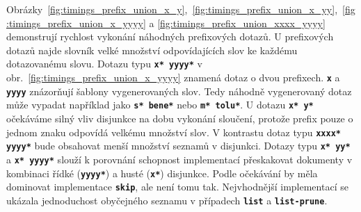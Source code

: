 \documentclass[11pt,letterpaper,oneside,openright]{book}
\newcommand{\bftt}[1]{\texttt{\textbf{#1}}}
\begin{document}
Obrázky~\ref{fig:timings_prefix_union_x_y},~\ref{fig:timings_prefix_union_x_yy},~\ref{fig:timings_prefix_union_x_yyyy}
a \ref{fig:timings_prefix_union_xxxx_yyyy} demonstrují rychlost vykonání
náhodných prefixových dotazů. U prefixových dotazů najde slovník velké množství
odpovídajících slov ke každému dotazovanému slovu. Dotazu typu \bftt{x* yyyy*}
v obr.~\ref{fig:timings_prefix_union_x_yyyy} znamená dotaz o dvou prefixech.
\bftt{x} a \bftt{yyyy} znázorňují šablony vygenerovaných slov. Tedy náhodně
vygenerovaný dotaz může vypadat například jako \bftt{s* bene*} nebo \bftt{m*
tolu*}. U dotazu \bftt{x* y*} očekáváme silný vliv disjunkce na dobu vykonání
sloučení, protože prefix pouze o jednom znaku odpovídá velkému množství slov. V
kontrastu dotaz typu \bftt{xxxx* yyyy*}  bude obsahovat menší množství seznamů
v disjunkci. Dotazy typu \bftt{x* yy*} a \bftt{x* yyyy*} slouží k porovnání
schopnost implementací přeskakovat dokumenty v kombinaci řídké (\bftt{yyyy*}) a
husté (\bftt{x*}) disjunkce. Podle očekávání by měla dominovat implementace
\bftt{skip}, ale není tomu tak. Nejvhodnější implementací se ukázala
jednoduchost obyčejného seznamu v případech \bftt{list} a \bftt{list-prune}.
\end{document}
